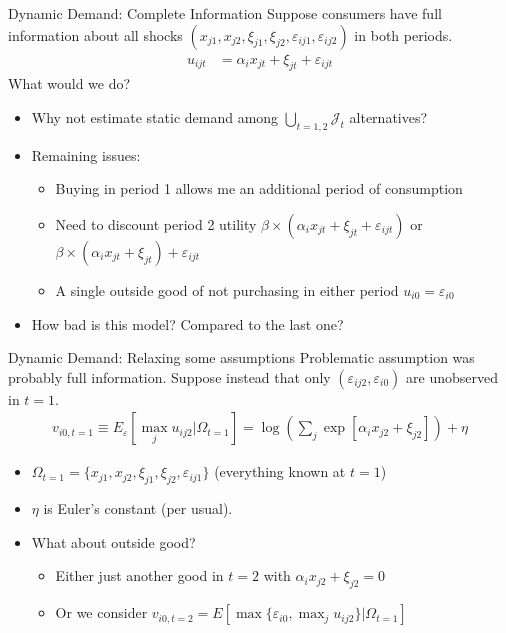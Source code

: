\documentclass[xcolor=pdftex,dvipsnames,table,mathserif,aspectratio=169]{beamer}
\begin{document}
\begin{frame}{Dynamic Demand: Complete Information}
Suppose consumers have full information about all shocks $(x_{j1},x_{j2},\xi_{j1},\xi_{j2},\varepsilon_{ij1},\varepsilon_{ij2})$ in both periods. 
\begin{align*}
u_{ijt} &=   \alpha_i x_{jt}  +  \xi_{jt} + \varepsilon_{ijt}
\end{align*}
What would we do?
\begin{itemize}
\item Why not estimate static demand among $\bigcup_{t=1,2}  \mathcal{J}_t $ alternatives?
\item Remaining issues:
\begin{itemize}
\item Buying in period 1 allows me an additional period of consumption
\item Need to discount period 2 utility $\beta \times ( \alpha_i x_{jt}  +  \xi_{jt} + \varepsilon_{ijt})$ or $\beta \times ( \alpha_i x_{jt}  +  \xi_{jt} )+\varepsilon_{ijt}$
\item A single outside good of not purchasing in either period $ u_{i0} =  \varepsilon_{i0} $
\end{itemize}
\item How bad is this model? Compared to the last one?
\end{itemize}
\end{frame}



\begin{frame}{Dynamic Demand: Relaxing some assumptions}
Problematic assumption was probably full information. Suppose instead that only $(\varepsilon_{ij2},\varepsilon_{i0})$ are \alert{unobserved} in $t=1$. 
\begin{align*}
v_{i0,t=1} \equiv E_{\varepsilon} [\max_j u_{ij2} | \Omega_{t=1} ] = \log \left( \sum_j \exp [ \alpha_i x_{j2}  +  \xi_{j2} ] \right) + \eta
\end{align*}
\begin{itemize}
\item $\Omega_{t=1}= \{x_{j1},x_{j2},\xi_{j1},\xi_{j2},\varepsilon_{ij1}\}$ (everything known at $t=1$) 
\item $\eta$ is Euler's constant (per usual).
\item What about outside good?
\begin{itemize}
\item Either just another good in $t=2$ with $\alpha_i x_{j2}+ \xi_{j2} = 0$
\item Or we consider $v_{i0,t=2}=E [\max \{ \varepsilon_{i0}, \max_j u_{ij2} \}  | \Omega_{t=1}]$
\end{itemize}
\end{itemize}
\end{frame}
\end{document}
